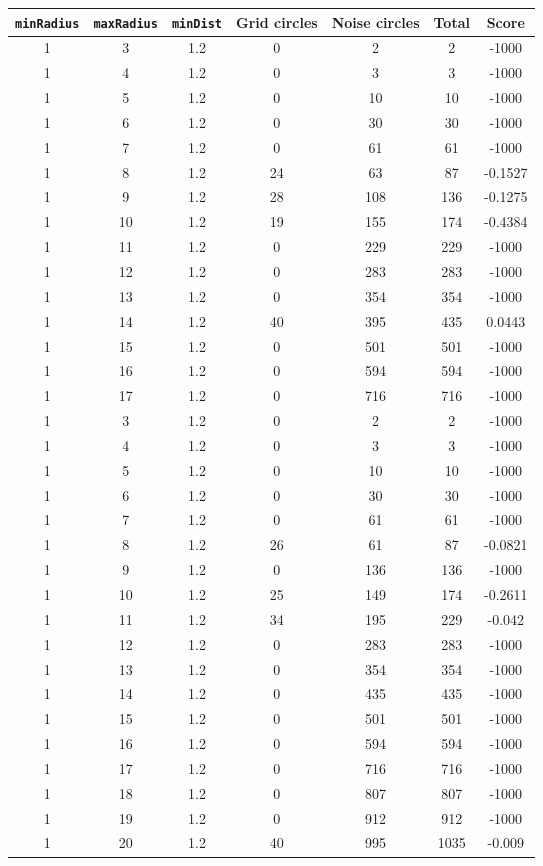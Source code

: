 \documentclass[letterpaper, 12pt]{article}
\begin{document}
\begin{longtable}{|c|c|c|c|c|c|c|}
\hline
\textbf{\texttt{minRadius}} & \textbf{\texttt{maxRadius}} & \textbf{\texttt{minDist}} & \textbf{Grid circles} & \textbf{Noise circles} & \textbf{Total} & \textbf{Score} \\
\hline
1 & 3 & 1.2 & 0 & 2 & 2 & -1000 \\
\hline
1 & 4 & 1.2 & 0 & 3 & 3 & -1000 \\
\hline
1 & 5 & 1.2 & 0 & 10 & 10 & -1000 \\
\hline
1 & 6 & 1.2 & 0 & 30 & 30 & -1000 \\
\hline
1 & 7 & 1.2 & 0 & 61 & 61 & -1000 \\
\hline
1 & 8 & 1.2 & 24 & 63 & 87 & -0.1527 \\
\hline
1 & 9 & 1.2 & 28 & 108 & 136 & -0.1275 \\
\hline
1 & 10 & 1.2 & 19 & 155 & 174 & -0.4384 \\
\hline
1 & 11 & 1.2 & 0 & 229 & 229 & -1000 \\
\hline
1 & 12 & 1.2 & 0 & 283 & 283 & -1000 \\
\hline
1 & 13 & 1.2 & 0 & 354 & 354 & -1000 \\
\hline
1 & 14 & 1.2 & 40 & 395 & 435 & 0.0443 \\
\hline
1 & 15 & 1.2 & 0 & 501 & 501 & -1000 \\
\hline
1 & 16 & 1.2 & 0 & 594 & 594 & -1000 \\
\hline
1 & 17 & 1.2 & 0 & 716 & 716 & -1000 \\
\hline
1 & 3 & 1.2 & 0 & 2 & 2 & -1000 \\
\hline
1 & 4 & 1.2 & 0 & 3 & 3 & -1000 \\
\hline
1 & 5 & 1.2 & 0 & 10 & 10 & -1000 \\
\hline
1 & 6 & 1.2 & 0 & 30 & 30 & -1000 \\
\hline
1 & 7 & 1.2 & 0 & 61 & 61 & -1000 \\
\hline
1 & 8 & 1.2 & 26 & 61 & 87 & -0.0821 \\
\hline
1 & 9 & 1.2 & 0 & 136 & 136 & -1000 \\
\hline
1 & 10 & 1.2 & 25 & 149 & 174 & -0.2611 \\
\hline
1 & 11 & 1.2 & 34 & 195 & 229 & -0.042 \\
\hline
1 & 12 & 1.2 & 0 & 283 & 283 & -1000 \\
\hline
1 & 13 & 1.2 & 0 & 354 & 354 & -1000 \\
\hline
1 & 14 & 1.2 & 0 & 435 & 435 & -1000 \\
\hline
1 & 15 & 1.2 & 0 & 501 & 501 & -1000 \\
\hline
1 & 16 & 1.2 & 0 & 594 & 594 & -1000 \\
\hline
1 & 17 & 1.2 & 0 & 716 & 716 & -1000 \\
\hline
1 & 18 & 1.2 & 0 & 807 & 807 & -1000 \\
\hline
1 & 19 & 1.2 & 0 & 912 & 912 & -1000 \\
\hline
1 & 20 & 1.2 & 40 & 995 & 1035 & -0.009 \\
\hline
\end{longtable}
\end{document}
